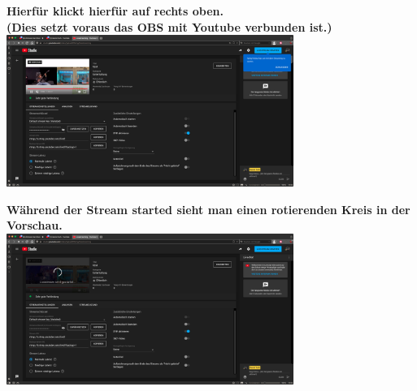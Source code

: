 \newpage
{}

{\vspace{0.2cm}}
\begin{center}
  \textbf{Hierfür klickt hierfür auf  rechts oben.} \\
  \textbf{(Dies setzt voraus das OBS mit Youtube verbunden ist.)} \\
  {\vspace{0.3cm}}
  \includegraphics[width=0.7\textwidth]{./pictures/OBSYOutubeConnected.png}
\end{center}



\begin{center}
  \textbf{Während der Stream started sieht man einen rotierenden Kreis in der Vorschau.} \\
  {\vspace{0.3cm}}
  \includegraphics[width=0.7\textwidth]{./pictures/OBSYOutubeConnected-START.png}
\end{center}

